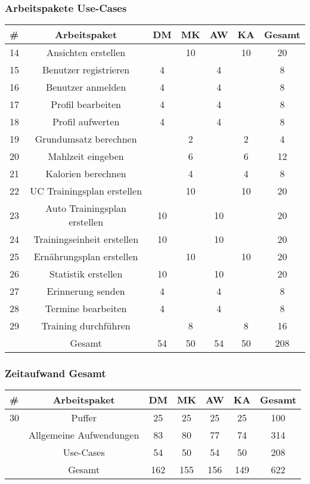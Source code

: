 \documentclass[12pt,a4paper,onecolumn]{article}
\begin{document}
\subsubsection{Arbeitspakete Use-Cases}
\begin{tabular}{|l|c|c|c|c|c|c|}
\hline
      \textbf{\#} & \textbf{Arbeitspaket} & \textbf{DM} & \textbf{MK} & \textbf{AW} & \textbf{KA} & \textbf{Gesamt} \\



\hline
14 & Ansichten erstellen & & 10 & & 10 & 20\\
\hline
15 & Benutzer registrieren & 4 & & 4 & & 8\\
\hline
16 & Benutzer anmelden & 4 & & 4 & & 8\\
\hline
17 & Profil bearbeiten & 4 & & 4 & & 8\\
\hline
18 & Profil aufwerten & 4 & & 4 & & 8\\
\hline
19 & Grundumsatz berechnen &  & 2 & & 2 & 4\\
\hline
20 & Mahlzeit eingeben & & 6 & & 6 & 12\\
\hline
21 & Kalorien berechnen & & 4 & & 4 & 8\\
\hline
22 & UC Trainingsplan erstellen & & 10 & & 10 & 20\\
\hline
23 & Auto Trainingsplan erstellen & 10 & & 10 & & 20\\
\hline
24 & Trainingseinheit erstellen & 10 &  & 10 &  & 20\\
\hline
25 & Ernährungsplan erstellen & & 10 & & 10 & 20 \\
\hline
26 & Statistik erstellen & 10 & & 10 & & 20\\
\hline
27 & Erinnerung senden & 4 & & 4 & & 8\\
\hline
28 & Termine bearbeiten & 4 & & 4 & & 8\\
\hline
29 & Training durchführen & & 8 & & 8 & 16\\
\hline
\hline
 & Gesamt & 54 & 50 & 54 & 50 & 208\\
\hline
\end{tabular}

\subsubsection{Zeitaufwand Gesamt}

\begin{tabular}{|l|c|c|c|c|c|c|}
\hline
      \textbf{\#} & \textbf{Arbeitspaket} & \textbf{DM} & \textbf{MK} & \textbf{AW} & \textbf{KA} & \textbf{Gesamt} \\
\hline
30 & Puffer & 25 & 25 & 25 & 25 & 100\\
\hline
 & Allgemeine Aufwendungen & 83 & 80 & 77 & 74 & 314\\
\hline
 & Use-Cases & 54 & 50 & 54 & 50 & 208\\


\hline
\hline
 & Gesamt & 162 & 155 & 156 & 149 & 622\\
\hline

\end{tabular}
\end{document}
